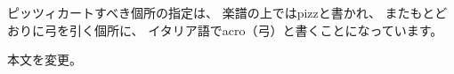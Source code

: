 \documentclass{jsarticle}
\begin{document}
ピッツィカートすべき個所の指定は、
楽譜の上ではpizzと書かれ、
またもとどおりに弓を引く個所に、
イタリア語でacro（弓）と書くことになっています。

本文を変更。
\printindex
\end{document}
